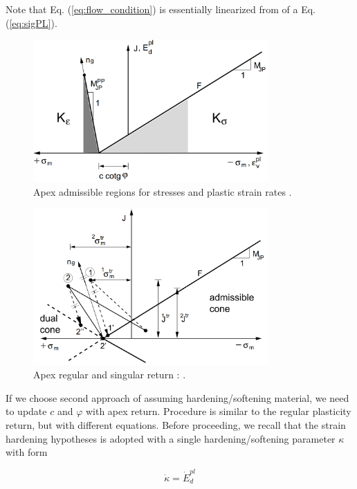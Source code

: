 Note that Eq. (\ref{eq:flow_condition}) is essentially linearized from of a Eq. (\ref{eq:sigPL}).

\begin{figure}[h!]
	\centering	
	\includegraphics[width=0.8\textwidth, angle=0]{obrazky/apex_cones.png}
	\caption[Apex abmissible regions]{Apex admissible regions for stresses and plastic strain rates \cite{geofem}.} \label{obr:apex_cones}
\end{figure}


\begin{figure}[h!]
	\centering	
	\includegraphics[width=0.8\textwidth, angle=0]{obrazky/apex_recursive_return.png}
	\caption[Apex return]{Apex regular and singular return \cite{geofem}: .} \label{obr:apex_return}
\end{figure}


If we choose second approach of assuming hardening/softening material, we need to update $c$ and $\varphi$ with apex return. Procedure is similar to the regular plasticity return, but with different equations. Before proceeding, we recall that the strain hardening hypotheses is adopted with a single hardening/softening parameter $\kappa$ with form

\begin{equation}\label{eq:hardening_parameter}
	\dot{\kappa} = \dot{E}_d^{pl}
\end{equation}

